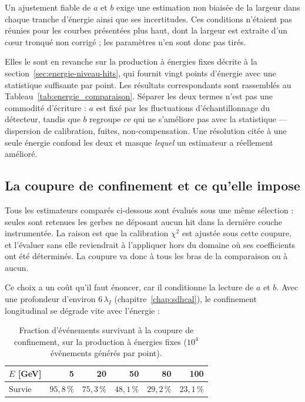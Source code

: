 Un ajustement fiable de $a$ et $b$ exige une estimation non biaisée de la largeur dans chaque tranche d'énergie ainsi que ses incertitudes. Ces conditions n'étaient pas réunies pour les courbes présentées plus haut, dont la largeur est extraite d'un c\oe{}ur tronqué non corrigé ; les paramètres n'en sont donc pas tirés.

Elles le sont en revanche sur la production à énergies fixes décrite à la section~\ref{sec:energie-niveau-hits}, qui fournit vingt points d'énergie avec une statistique suffisante par point. Les résultats correspondants sont rassemblés au Tableau~\ref{tab:energie_comparaison}. Séparer les deux termes n'est pas une commodité d'écriture : $a$ est fixé par les fluctuations d'échantillonnage du détecteur, tandis que $b$ regroupe ce qui ne s'améliore pas avec la statistique — dispersion de calibration, fuites, non-compensation. Une résolution citée à une seule énergie confond les deux et masque \emph{lequel} un estimateur a réellement amélioré.

\subsection{La coupure de confinement et ce qu'elle impose}
\label{subsec:confinement}

Tous les estimateurs comparés ci-dessous sont évalués sous une même sélection : seules sont retenues les gerbes ne déposant aucun hit dans la dernière couche instrumentée. La raison est que la calibration $\chi^2$ est ajustée sous cette coupure, et l'évaluer sans elle reviendrait à l'appliquer hors du domaine où ses coefficients ont été déterminés. La coupure va donc à tous les bras de la comparaison ou à aucun.

Ce choix a un coût qu'il faut énoncer, car il conditionne la lecture de $a$ et $b$. Avec une profondeur d'environ $6\,\lambda_I$ (chapitre~\ref{chap:sdhcal}), le confinement longitudinal se dégrade vite avec l'énergie :

\begin{table}[!ht]
\centering
\caption{Fraction d'événements survivant à la coupure de confinement, sur la production à énergies fixes ($10^{4}$ événements générés par point).}
\label{tab:confinement}
\small
\begin{tabular}{lrrrrr}
\toprule
$E$ [GeV] & 5 & 20 & 50 & 80 & 100 \\
\midrule
Survie & $95{,}8\,\%$ & $75{,}3\,\%$ & $48{,}1\,\%$ & $29{,}2\,\%$ & $23{,}1\,\%$ \\
\bottomrule
\end{tabular}
\end{table}


